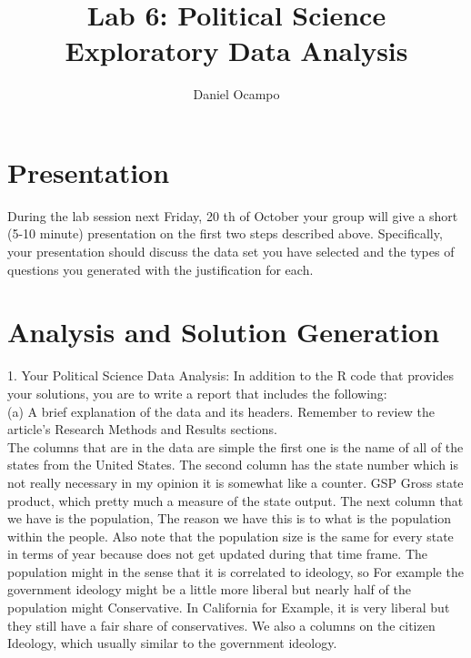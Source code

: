 \documentclass[11pt]{article}
\begin{document}
%
\author{Daniel Ocampo   }
\title{Lab 6: Political Science Exploratory Data Analysis}
\maketitle

\section{Presentation}
During the lab session next Friday, 20 th of October your group will give a short (5-10
minute) presentation on the first two steps described above. Specifically, your presentation
should discuss the data set you have selected and the types of questions you generated with the
justification for each.
\section{Analysis and Solution Generation}

1. Your Political Science Data Analysis: In addition to the R code that provides your
solutions, you are to write a report that includes the following:\\
(a) A brief explanation of the data and its headers. Remember to review the article’s
Research Methods and Results sections.\\

The columns that are in the data are simple the first one is the name of all of the states from the United States. The second column has the state number which is not really necessary in my opinion it is somewhat like a counter. GSP Gross state product, which pretty much a measure of the state output. The next column that we have is the population, The reason we have this is to what is the population within the people. Also note that the population size is the same for every state in terms of year because does not get updated during that time frame. The population might in the sense that it is correlated to ideology, so For example the government ideology might be  a little more liberal but nearly half of the population might Conservative. In California for Example, it is very liberal but they still have a fair share of conservatives. We also a columns on the citizen Ideology, which usually similar to the government ideology. \\
\end{document}
